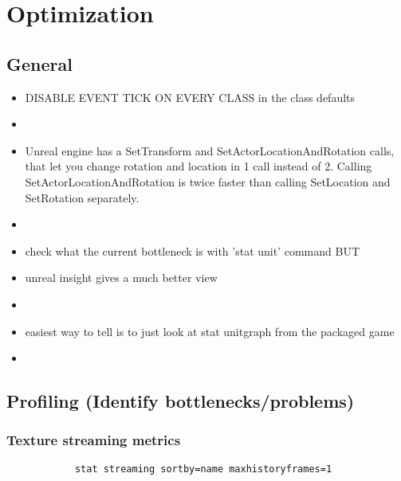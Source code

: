 \chapter{Optimization}
    \section{General}
    \begin{itemize}
        \item DISABLE EVENT TICK ON EVERY CLASS in the class defaults
        \item 
        \item Unreal engine has a SetTransform and SetActorLocationAndRotation calls, that let you change rotation and location in 1 call instead of 2. Calling SetActorLocationAndRotation is twice faster than calling SetLocation and SetRotation separately.
        \item 
        \item check what the current bottleneck is with 'stat unit' command BUT
        \item unreal insight gives a much better view
        \item 
        \item easiest way to tell is to just look at stat unitgraph from the packaged game
        \item 
    \end{itemize}

    \section{Profiling (Identify bottlenecks/problems)}
        \subsection{Texture streaming metrics}
                \begin{lstlisting}
            stat streaming sortby=name maxhistoryframes=1                
                \end{lstlisting}

